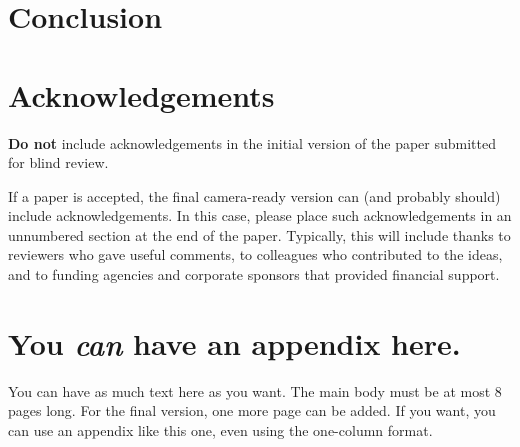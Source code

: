 \documentclass[nohyperref]{article}
\theoremstyle{plain}
\theoremstyle{definition}
\theoremstyle{remark}
\begin{document}
\section{Conclusion}

\section*{Acknowledgements}

\textbf{Do not} include acknowledgements in the initial version of
the paper submitted for blind review.

If a paper is accepted, the final camera-ready version can (and
probably should) include acknowledgements. In this case, please
place such acknowledgements in an unnumbered section at the
end of the paper. Typically, this will include thanks to reviewers
who gave useful comments, to colleagues who contributed to the ideas,
and to funding agencies and corporate sponsors that provided financial
support.


\nocite{langley00}





\newpage
\appendix
\onecolumn
\section{You \emph{can} have an appendix here.}

You can have as much text here as you want. The main body must be at most $8$ pages long.
For the final version, one more page can be added.
If you want, you can use an appendix like this one, even using the one-column format.
\end{document}
